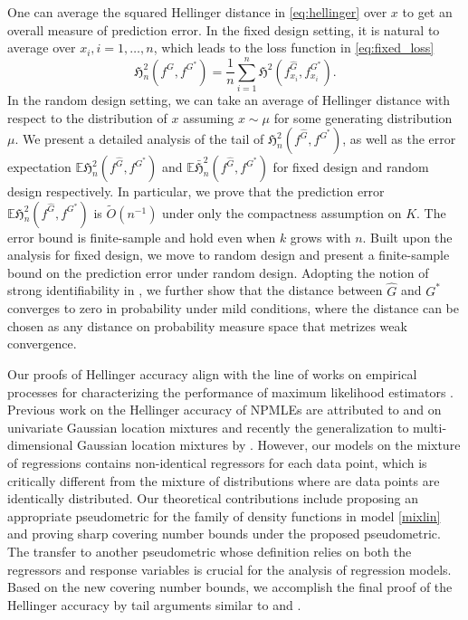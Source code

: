 \documentclass[11pt]{article}
\numberwithin{equation}{section}
\newcommand{\Expt}{\mathbb{E}} %
\begin{document}
One can average the squared Hellinger distance in \eqref{eq:hellinger} over $x$ to get an overall measure of prediction error. In the fixed design setting, it is natural to average over $x_i, i = 1,\dots,n$, which leads to the loss function in \eqref{eq:fixed_loss}
\begin{equation}
\mathfrak{H}_n^2\left(f^{\hat{G}}, f^{G^*}\right) = \frac{1}{n} \sum_{i=1}^n \mathfrak{H}^2\left(f^{\hat{G}}_{x_i}, f^{G^*}_{x_i}\right).
\label{eq:fixed_loss}
\end{equation}
In the random design setting, we can take an average of Hellinger distance with respect to the distribution of $x$ assuming $x \sim \mu$ for some generating  distribution $\mu$. We present a detailed analysis of the tail of $\mathfrak{H}_n^2\left(f^{\hat{G}}, f^{G^*}\right)$, as well as the error expectation $\Expt \mathfrak{H}_n^2 \left(f^{\hat{G}}, f^{G^*}\right)$ and $\Expt \bar{\mathfrak{H}}_n^2\left(f^{\hat{G}}, f^{G^*}\right) $ for fixed design and random design respectively. In particular, we prove that the prediction error $\Expt \mathfrak{H}_n^2  \left(f^{\hat{G}}, f^{G^*}\right) $ is $ \tilde{O}(n^{-1})$ under only the compactness assumption on $K$. The error bound is finite-sample and hold even when $k$ grows with $n$. Built upon the analysis for fixed design, we move to random design and present a finite-sample bound on the prediction error under random design. Adopting the notion of strong identifiability in \citet{beran1994minimum}, we further show that the distance between $\hat{G}$ and $G^*$ converges to zero in probability under mild conditions, where the distance can be chosen as any distance on probability measure space that metrizes weak convergence.

Our proofs of Hellinger accuracy align with the line of works on empirical processes for characterizing the performance of maximum likelihood estimators \citep{van1996weak}. Previous work on the Hellinger accuracy of NPMLEs are attributed to \citet{ghosal2001entropies} and \citet{zhang2009generalized} on univariate Gaussian location mixtures and recently the generalization to multi-dimensional Gaussian location mixtures by \citet{saha2020nonparametric}. However, our models on the mixture of regressions contains non-identical regressors for each data point, which is critically different from the mixture of distributions where are data points are identically distributed. Our theoretical contributions include proposing an appropriate pseudometric for the family of density functions in model \eqref{mixlin} and proving sharp covering number bounds under the proposed pseudometric. The transfer to another pseudometric whose definition relies on both the regressors and response variables is crucial for the analysis of regression models. Based on the new covering number bounds, we accomplish the final proof of the Hellinger accuracy by tail arguments similar to \citet{zhang2009generalized} and \citet{saha2020nonparametric}.
\end{document}
